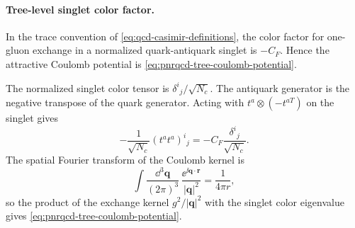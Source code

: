 \paragraph{Tree-level singlet color factor.}
In the trace convention of \eqref{eq:qcd-casimir-definitions}, the color
factor for one-gluon exchange in a normalized quark-antiquark singlet is
\(-C_F\).  Hence the attractive Coulomb potential is
\eqref{eq:pnrqcd-tree-coulomb-potential}.

The normalized singlet color tensor is
\(\delta^i{}_j/\sqrt{N_c}\).  The antiquark generator is the negative
transpose of the quark generator.  Acting with \(t^a\otimes(-t^{aT})\) on the
singlet gives
\[
  -\frac1{\sqrt{N_c}}(t^at^a)^i{}_j
  =
  -C_F\frac{\delta^i{}_j}{\sqrt{N_c}} .
\]
The spatial Fourier transform of the Coulomb kernel is
\[
  \int\frac{\dd^3\mathbf q}{(2\pi)^3}\,
  \frac{\ee^{\ii\mathbf q\cdot\mathbf r}}{|\mathbf q|^2}
  =
  \frac1{4\pi r},
\]
so the product of the exchange kernel \(g^2/|\mathbf q|^2\) with the singlet
color eigenvalue gives \eqref{eq:pnrqcd-tree-coulomb-potential}.


